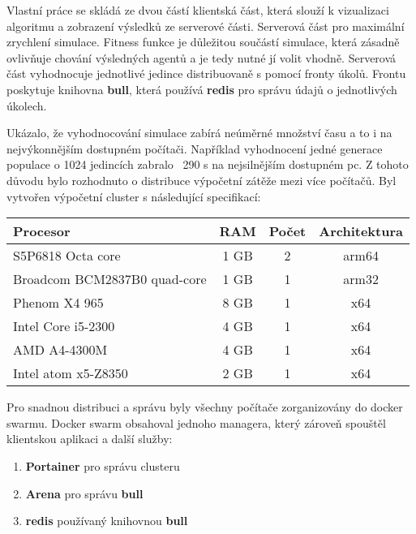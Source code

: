 Vlastní práce se skládá ze dvou částí klientská část, která slouží k vizualizaci algoritmu a zobrazení výsledků ze serverové části. Serverová část pro maximální zrychlení simulace. 
Fitness funkce je důležitou součástí simulace, která zásadně ovlivňuje chování výsledných agentů a je tedy nutné jí volit vhodně. 
Serverová část vyhodnocuje jednotlivé jedince distribuovaně s pomocí fronty úkolů. Frontu poskytuje knihovna \textbf{bull}, která používá \textbf{redis} pro správu údajů o jednotlivých úkolech.

Ukázalo, že vyhodnocování simulace zabírá neúměrné množství času a to i na nejvýkonnějším dostupném počítači. 
Například vyhodnocení jedné generace populace o 1024 jedincích zabralo ~290 s na nejsilnějším dostupném pc. Z tohoto důvodu bylo rozhodnuto o distribuce výpočetní zátěže mezi více počítačů. Byl vytvořen výpočetní cluster s následující specifikací:

\begin{tabular}{|l|c|c|c|}
	\hline 
	Procesor & RAM & Počet & Architektura\\ 
	\hline 
	S5P6818 Octa core & 1 GB & 2 & arm64 \\ 
	\hline 
	Broadcom BCM2837B0 quad-core & 1 GB & 1 & arm32 \\ 
	\hline 
	Phenom X4 965 & 8 GB & 1 & x64 \\ 
	\hline
	Intel Core i5-2300 & 4 GB & 1 & x64 \\ 
	\hline
	AMD A4-4300M & 4 GB & 1 & x64 \\ 
	\hline 
	Intel atom x5-Z8350 & 2 GB & 1 & x64 \\ 
	\hline
\end{tabular} 

Pro snadnou distribuci a správu byly všechny počítače zorganizovány do docker swarmu. Docker swarm obsahoval jednoho managera, který zároveň spouštěl klientskou aplikaci a další služby:

\begin{enumerate}
	\item \textbf{Portainer} pro správu clusteru
	\item \textbf{Arena} pro správu \textbf{bull}
	\item \textbf{redis} používaný knihovnou \textbf{bull}
\end{enumerate}

